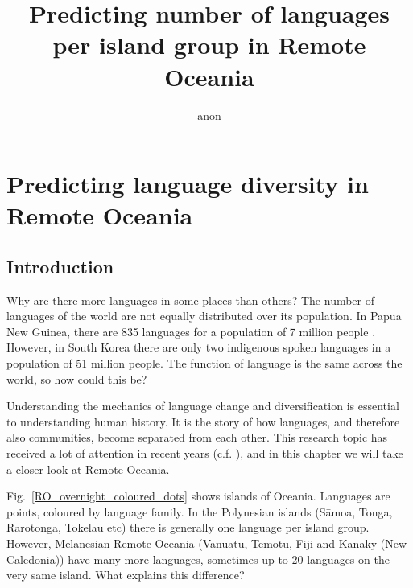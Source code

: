 \documentclass[a4paper,10pt]{article} %
\title{Predicting number of languages per island group in Remote Oceania}
\author{anon}
\begin{document}
\def\code#1{\texttt{#1}}

\thispagestyle{empty}

\maketitle
\thispagestyle{empty}

\newpage



\newpage
\singlespacing
\tableofcontents

\newpage
\listoffigures
 \listoftables
 \vspace{0.7cm}


\newpage
{}



\newpage

\section{Predicting language diversity in Remote Oceania}
\label{chapter_pol_complex}
\subsection{Introduction}
\doublespacing
Why are there more languages in some places than others? The number of languages of the world are not equally distributed over its population. In Papua New Guinea, there are 835 languages for a population of 7 million people \citep{ethnologue22, cia_world_factbook_2019}. However, in South Korea there are only two indigenous spoken languages in a population of 51 million people. The function of language is the same across the world, so how could this be?

Understanding the mechanics of language change and diversification is essential to understanding human history. It is the story of how languages, and therefore also communities, become separated from each other. This research topic has received a lot of attention in recent years (c.f. \citet{gavin2017process,  greenhill2015demographic, Pacheco_Coelho_2019, hua2019ecological}), and in this chapter we will take a closer look at Remote Oceania. 

Fig.~\ref{RO_overnight_coloured_dots} shows islands of Oceania. Languages are points, coloured by language family. In the Polynesian islands (S\={a}moa, Tonga, Rarotonga, Tokelau etc) there is generally one language per island group. However, Melanesian Remote Oceania (Vanuatu, Temotu, Fiji and Kanaky (New Caledonia)) have many more languages, sometimes up to 20 languages on the very same island. What explains this difference?
\end{document}
